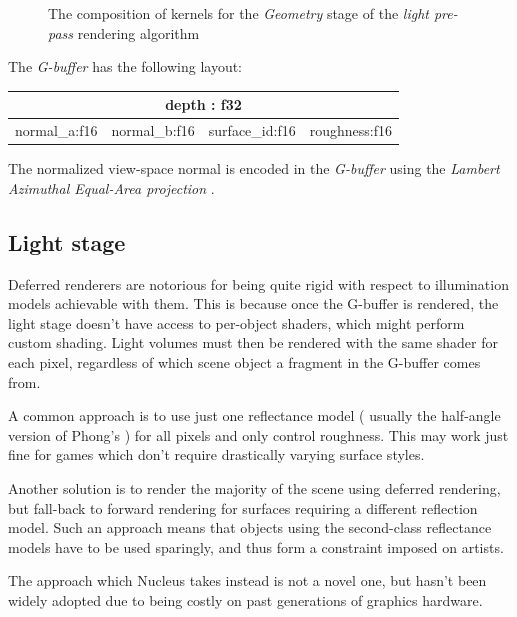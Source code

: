 \begin{figure}[h!]
  \centering
    \caption[Light Pre-Pass Stage 1]{The composition of kernels for the \emph{Geometry} stage of the  \emph{light pre-pass} rendering algorithm}
  \label{fig:DeferredLightingStage1}
\end{figure}

The \emph{G-buffer} has the following layout:

\begin{center}
\begin{tabular}{ | c | c | c | c | }
\hline
\multicolumn{4}{|c|}{ depth : f32 } \\
\hline
normal\_a:f16 & normal\_b:f16 & surface\_id:f16 & roughness:f16 \\
\hline
\end{tabular}
\end{center}

The normalized view-space normal is encoded in the \emph{G-buffer} using the \emph{Lambert Azimuthal Equal-Area projection} \cite{ArasNormalStorage}.

\subsection{Light stage}

Deferred renderers are notorious for being quite rigid with respect to illumination models achievable with them. This is because once the G-buffer is rendered, the light stage doesn't have access to per-object shaders, which might perform custom shading. Light volumes must then be rendered with the same shader for each pixel, regardless of which scene object a fragment in the G-buffer comes from.

A common approach is to use just one reflectance model ( usually the half-angle version of Phong's ) for all pixels and only control roughness. This may work just fine for games which don't require drastically varying surface styles.

Another solution is to render the majority of the scene using deferred rendering, but fall-back to forward rendering for surfaces requiring a different reflection model. Such an approach means that objects using the second-class reflectance models have to be used sparingly, and thus form a constraint imposed on artists.

The approach which Nucleus takes instead is not a novel one, but hasn't been widely adopted due to being costly on past generations of graphics hardware.

